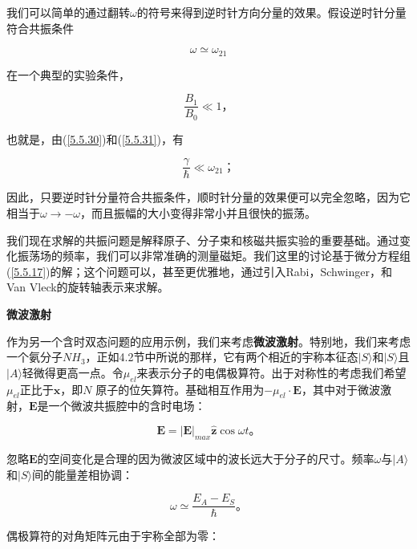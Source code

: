 ﻿\documentclass[UTF8,twoside]{ctexart}
\begin{document}
\noindent 我们可以简单的通过翻转$\omega$的符号来得到逆时针方向分量的效果。假设逆时针分量符合共振条件

\begin{equation} \label{5.5.33}
\omega\simeq\omega_{21}
\end{equation}

\noindent 在一个典型的实验条件，

\begin{equation} \label{5.5.34}
\dfrac{B_1}{B_0}\ll 1\text{，}
\end{equation}

\noindent 也就是，由(\ref{5.5.30})和(\ref{5.5.31})，有

\begin{equation} \label{5.5.35}
\dfrac{\gamma}{\hbar}\ll\omega_{21}\text{；}
\end{equation}

\noindent 因此，只要逆时针分量符合共振条件，顺时针分量的效果便可以完全忽略，因为它相当于$\omega\rightarrow-\omega$，而且振幅的大小变得非常小并且很快的振荡。

我们现在求解的共振问题是解释原子、分子束和核磁共振实验的重要基础。通过变化振荡场的频率，我们可以非常准确的测量磁矩。我们这里的讨论基于微分方程组(\ref{5.5.17})的解；这个问题可以，甚至更优雅地，通过引入Rabi，Schwinger，和Van Vleck的旋转轴表示来求解。

\noindent \textbf{微波激射}

\noindent 作为另一个含时双态问题的应用示例，我们来考虑\textbf{微波激射}。特别地，我们来考虑一个氨分子$NH_3$，正如4.2节中所说的那样，它有两个相近的宇称本征态$|S\rangle$和$|S\rangle$且$|A\rangle$轻微得更高一点。令$\mu_{e\!l}$来表示分子的电偶极算符。出于对称性的考虑我们希望$\mu_{e\!l}$正比于$\boldsymbol{x}$，即$N$ 原子的位矢算符。基础相互作用为$-\mu_{e\!l}\cdot\boldsymbol{E}$，其中对于微波激射，$\boldsymbol{E}$是一个微波共振腔中的含时电场：

\begin{equation} \label{5.5.36}
\boldsymbol{E}=|\boldsymbol{E}|_{max}\hat{\boldsymbol{z}}\cos\omega t\text{。}
\end{equation}

\noindent 忽略$\boldsymbol{E}$的空间变化是合理的因为微波区域中的波长远大于分子的尺寸。频率$\omega$与$|A\rangle$和$|S\rangle$间的能量差相协调：

\begin{equation} \label{5.5.37}
\omega\simeq\dfrac{E_A-E_S}{\hbar}\text{。}
\end{equation}

\noindent 偶极算符的对角矩阵元由于宇称全部为零：
\end{document}
